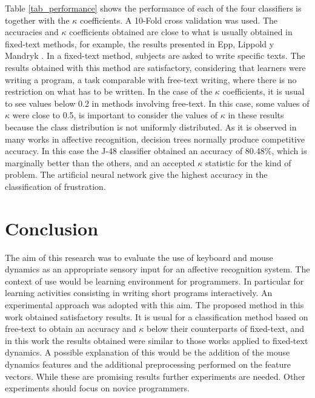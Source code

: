 \documentclass[a4paper]{llncs}
\begin{document}
Table \ref{tab_performance} shows the performance of each of the four classifiers is together 
with the $\kappa$ coefficients. A 10-Fold cross validation was used. 
The accuracies and $\kappa$ coefficients obtained are close to what is
usually obtained in fixed-text methods, for example, the results presented in
Epp, Lippold y Mandryk \cite{epp2011identifying}. %
In a fixed-text method, subjects are asked to write specific texts.											 
The results obtained with this method are satisfactory, considering that learners
were writing a program, a task comparable with free-text writing, where there
is no restriction on what has to be written. %
In the case of the $\kappa$ coefficients, it is
usual to see values below 0.2 in methods involving free-text. In this case, some
values of $\kappa$ were close to 0.5, is important to consider the values of $\kappa$
in these results because the class distribution is not uniformly distributed. As
it is observed in many works in affective recognition, decision trees normally
produce competitive accuracy. In this case the J-48 classifier obtained an
accuracy of 80.48\%, which is marginally better than the others, and an accepted $\kappa$
statistic for the kind of problem. The artificial neural network %
give the highest
accuracy in the classification of frustration.

 
\section{Conclusion}
The aim of this research was to evaluate the use of keyboard and mouse dynamics 
as an appropriate sensory input for an affective recognition system. The context
of use would be learning environment for programmers. In particular for learning
activities consisting in writing short programs interactively. An experimental
approach was adopted with this aim. The proposed method in this work obtained
satisfactory results. It is usual for a classification method based on free-text
to obtain an accuracy and $\kappa$ below their counterparts of fixed-text, and in this
work the results obtained were similar to those works applied to fixed-text 
dynamics. A possible explanation of this would be the addition of the mouse 
dynamics features and the additional preprocessing performed on the feature vectors. 
While these are promising results further experiments are needed. Other experiments
should focus on novice programmers.
\end{document}
